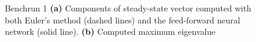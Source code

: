 \begin{figure}[H]
\centering
{}
\qquad
{}
\caption{Benchrun 1 \textbf{(a)} Components of steady-state vector computed with both Euler's method (dashed lines) and the feed-forward neural network (solid line). \textbf{(b)} Computed maximum eigenvalue }
\label{fig:benchrun1}
\end{figure}

